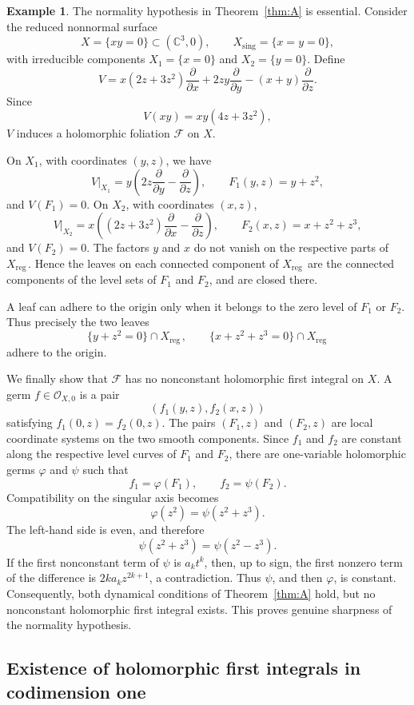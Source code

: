 \documentclass[11pt,twoside]{amsart}
\newcommand{\reg}{\mathrm{reg}\,}
\newcommand{\C}{\mathbb C}
\newcommand{\F}{\mathcal F}
\DeclareMathOperator{\sing}{sing}
\theoremstyle{definition}
\newtheorem{exe}{Example}
\begin{document}
\begin{exe}\label{exem2}
The normality hypothesis in Theorem~\ref{thm:A} is essential.  Consider
the reduced nonnormal surface
\[
 X=\{xy=0\}\subset(\C^3,0),
 \qquad X_{\sing}=\{x=y=0\},
\]
with irreducible components $X_1=\{x=0\}$ and $X_2=\{y=0\}$.  Define
\[
 V=x(2z+3z^2)\frac{\partial}{\partial x}
   +2zy\frac{\partial}{\partial y}
   -(x+y)\frac{\partial}{\partial z}.
\]
Since
\[
 V(xy)=xy(4z+3z^2),
\]
$V$ induces a holomorphic foliation $\F$ on $X$.

On $X_1$, with coordinates $(y,z)$, we have
\[
 V|_{X_1}=y\left(2z\frac{\partial}{\partial y}
                  -\frac{\partial}{\partial z}\right),
 \qquad F_1(y,z)=y+z^2,
\]
and $V(F_1)=0$.  On $X_2$, with coordinates $(x,z)$,
\[
 V|_{X_2}=x\left((2z+3z^2)\frac{\partial}{\partial x}
                  -\frac{\partial}{\partial z}\right),
 \qquad F_2(x,z)=x+z^2+z^3,
\]
and $V(F_2)=0$.  The factors $y$ and $x$ do not vanish on the respective
parts of $X_{\reg}$. Hence the leaves on each connected component of
$X_{\reg}$ are the connected components of the level sets of $F_1$ and
$F_2$, and are closed there.

A leaf can adhere to the origin only when it belongs to the zero level of
$F_1$ or $F_2$.  Thus precisely the two leaves
\[
 \{y+z^2=0\}\cap X_{\reg},
 \qquad
 \{x+z^2+z^3=0\}\cap X_{\reg}
\]
adhere to the origin.

We finally show that $\F$ has no nonconstant holomorphic first integral on
$X$.  A germ $f\in\mathcal O_{X,0}$ is a pair
\[
 (f_1(y,z),f_2(x,z))
\]
satisfying $f_1(0,z)=f_2(0,z)$. The pairs $(F_1,z)$ and $(F_2,z)$ are local
coordinate systems on the two smooth components. Since $f_1$ and $f_2$ are
constant along the respective level curves of $F_1$ and $F_2$, there are
one-variable holomorphic germs $\varphi$ and $\psi$ such that
\[
 f_1=\varphi(F_1),\qquad f_2=\psi(F_2).
\]
Compatibility on the singular axis becomes
\[
 \varphi(z^2)=\psi(z^2+z^3).
\]
The left-hand side is even, and therefore
\[
 \psi(z^2+z^3)=\psi(z^2-z^3).
\]
If the first nonconstant term of $\psi$ is $a_kt^k$, then, up to sign, the
first nonzero term of the difference is $2ka_kz^{2k+1}$, a contradiction.
Thus $\psi$, and then $\varphi$, is constant.  Consequently, both
dynamical conditions of Theorem~\ref{thm:A} hold, but no nonconstant
holomorphic first integral exists.  This proves genuine sharpness of the
normality hypothesis.
\end{exe}


\subsection{Existence of holomorphic first integrals in codimension one}
\end{document}

